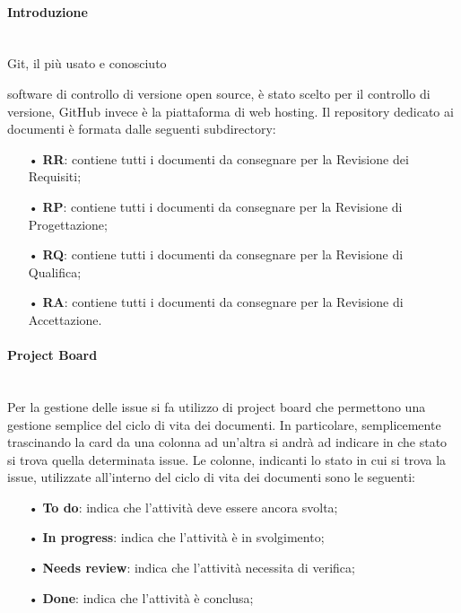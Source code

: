 \paragraph{Introduzione}\mbox{}\\
Git, il più usato e conosciuto {software di controllo di {versione} open source, è stato scelto per il controllo di versione, GitHub invece è la piattaforma di web hosting. 
\newline
Il repository dedicato ai documenti è formata dalle seguenti subdirectory:
\begin{itemize}
\item[•] \textbf{RR}: contiene tutti i documenti da consegnare per la Revisione dei Requisiti;
\item[•] \textbf{RP}: contiene tutti i documenti da consegnare per la Revisione di Progettazione;
\item[•] \textbf{RQ}: contiene tutti i documenti da consegnare per la Revisione di Qualifica;
\item[•] \textbf{RA}: contiene tutti i documenti da consegnare per la Revisione di Accettazione.
\end{itemize}

\paragraph{Project Board}\mbox{}\\
\label{sec:projectboard}
Per la gestione delle {issue} si fa utilizzo di {project board} che permettono una gestione semplice del ciclo di vita dei documenti. 
In particolare, semplicemente trascinando la {card} da una colonna ad un'altra si andrà ad indicare in che stato si trova quella determinata issue.
Le colonne, indicanti lo stato in cui si trova la issue, utilizzate all'interno del ciclo di vita dei documenti sono le seguenti:
\begin{itemize}
\item[•] \textbf{To do}: indica che l'attività deve essere ancora svolta;
\item[•] \textbf{In progress}: indica che l'attività è in svolgimento;
\item[•] \textbf{Needs review}: indica che l'attività necessita di verifica;
\item[•] \textbf{Done}: indica che l'attività è conclusa;
\end{itemize}
}
